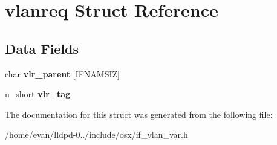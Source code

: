 \section{vlanreq \-Struct \-Reference}
\label{structvlanreq}
\subsection*{\-Data \-Fields}
\begin{DoxyCompactItemize}
\item 
char {\bfseries vlr\-\_\-parent} [\-I\-F\-N\-A\-M\-S\-I\-Z]\label{structvlanreq_af72adeb3b15b682ecdb7776ceeb53721}

\item 
u\-\_\-short {\bfseries vlr\-\_\-tag}\label{structvlanreq_a066f4bc8967552cbdee3357e5638c59f}

\end{DoxyCompactItemize}


\-The documentation for this struct was generated from the following file\-:\begin{DoxyCompactItemize}
\item 
/home/evan/lldpd-\/0../include/osx/if\-\_\-vlan\-\_\-var.\-h\end{DoxyCompactItemize}
